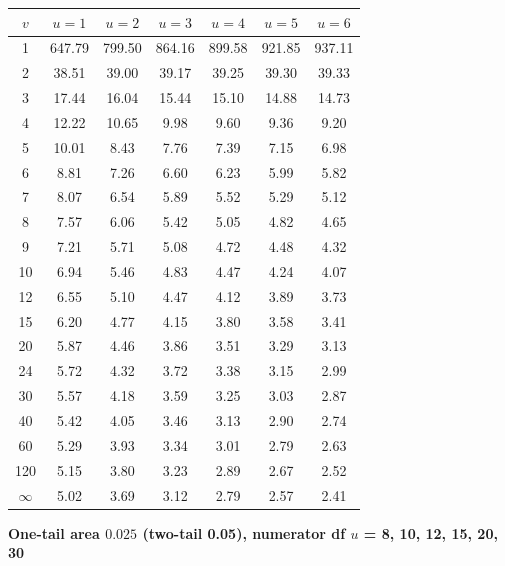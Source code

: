 \begin{center}
\small
\begin{tabular}{c|cccccc}
\toprule
$v$ & $u=1$ & $u=2$ & $u=3$ & $u=4$ & $u=5$ & $u=6$ \\
\midrule
1 & 647.79 & 799.50 & 864.16 & 899.58 & 921.85 & 937.11 \\
2 & 38.51 & 39.00 & 39.17 & 39.25 & 39.30 & 39.33 \\
3 & 17.44 & 16.04 & 15.44 & 15.10 & 14.88 & 14.73 \\
4 & 12.22 & 10.65 & 9.98 & 9.60 & 9.36 & 9.20 \\
5 & 10.01 & 8.43 & 7.76 & 7.39 & 7.15 & 6.98 \\
6 & 8.81 & 7.26 & 6.60 & 6.23 & 5.99 & 5.82 \\
7 & 8.07 & 6.54 & 5.89 & 5.52 & 5.29 & 5.12 \\
8 & 7.57 & 6.06 & 5.42 & 5.05 & 4.82 & 4.65 \\
9 & 7.21 & 5.71 & 5.08 & 4.72 & 4.48 & 4.32 \\
10 & 6.94 & 5.46 & 4.83 & 4.47 & 4.24 & 4.07 \\
12 & 6.55 & 5.10 & 4.47 & 4.12 & 3.89 & 3.73 \\
15 & 6.20 & 4.77 & 4.15 & 3.80 & 3.58 & 3.41 \\
20 & 5.87 & 4.46 & 3.86 & 3.51 & 3.29 & 3.13 \\
24 & 5.72 & 4.32 & 3.72 & 3.38 & 3.15 & 2.99 \\
30 & 5.57 & 4.18 & 3.59 & 3.25 & 3.03 & 2.87 \\
40 & 5.42 & 4.05 & 3.46 & 3.13 & 2.90 & 2.74 \\
60 & 5.29 & 3.93 & 3.34 & 3.01 & 2.79 & 2.63 \\
120 & 5.15 & 3.80 & 3.23 & 2.89 & 2.67 & 2.52 \\
$\infty$ & 5.02 & 3.69 & 3.12 & 2.79 & 2.57 & 2.41 \\
\bottomrule
\end{tabular}
\end{center}

\textbf{One-tail area $0.025$ (two-tail 0.05), numerator df $u$ = 8, 10, 12, 15, 20, 30}

